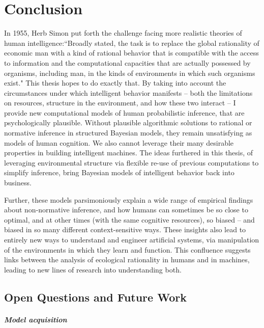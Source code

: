 \chapter{Conclusion}
\label{chap:conclusion}

In 1955, Herb Simon put forth the challenge facing more realistic theories of human intelligence:``Broadly stated, the task is to replace the global rationality of economic man with a kind of rational behavior that is compatible with the access to information and the computational capacities that are actually possessed by organisms, including man, in the kinds of environments in which such organisms exist." This thesis hopes to do exactly that. By taking into account the circumstances under which intelligent behavior manifests -- both the limitations on resources, structure in the environment, and how these two interact -- I provide new computational models of human probabilistic inference, that are psychologically plausible. Without plausible algorithmic solutions to rational or normative inference in structured Bayesian models, they remain unsatisfying as models of human cognition. We also cannot leverage their many desirable properties in building intelligent machines. The ideas furthered in this thesis, of leveraging environmental structure via flexible re-use of previous computations to simplify inference, bring Bayesian models of intelligent behavior back into business.

Further, these models parsimoniously explain a wide range of empirical findings about non-normative inference, and how humans can sometimes be so close to optimal, and at other times (with the same cognitive resources), so biased -- and biased in so many different context-sensitive ways. These insights also lead to entirely new ways to understand and engineer artificial systems, via manipulation of the environments in which they learn and function. This confluence suggests links between the analysis of ecological rationality in humans and in machines, leading to new lines of research into understanding both.

\section*{Open Questions and Future Work}

\paragraph{Model acquisition}

